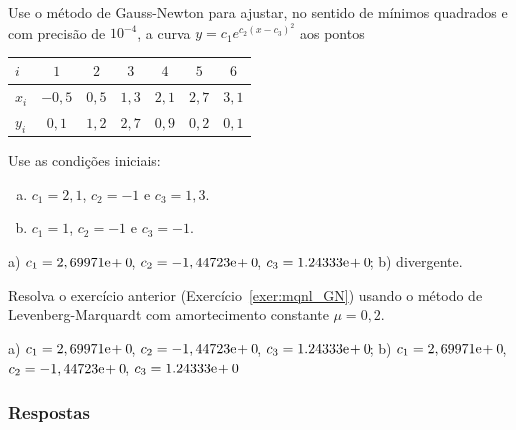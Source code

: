 \begin{exer}\label{exer:mqnl_GN}
  Use o método de Gauss-Newton para ajustar, no sentido de mínimos quadrados e com precisão de $10^{-4}$, a curva $y = c_1e^{c_2(x-c_3)^2}$ aos pontos
  \begin{center}
    \begin{tabular}{l|cccccc}
      $i$ & $1$ & $2$ & $3$ & $4$ & $5$ & $6$ \\\hline
      $x_i$ & $-0,5$ & $0,5$ & $1,3$ & $2,1$ & $2,7$ & $3,1$ \\
      $y_i$ & $0,1$ & $1,2$ & $2,7$ & $0,9$ & $0,2$ & $0,1$ \\\hline
    \end{tabular}
  \end{center}
Use as condições iniciais:
\begin{enumerate}[a)]
\item $c_1 = 2,1$, $c_2=-1$ e $c_3=1,3$.
\item $c_1=1$, $c_2=-1$ e $c_3=-1$.
\end{enumerate}
\end{exer}
\begin{resp}
  a) $c_1 = 2,69971\mathrm{e}\!+0\!$, $c_2 = -1,44723\mathrm{e}\!+0\!$, $c_3 = 1.24333\mathrm{e}\!+0\!$; b) divergente.
\end{resp}

\begin{exer}
  Resolva o exercício anterior (Exercício~\ref{exer:mqnl_GN}) usando o método de Levenberg-Marquardt com amortecimento constante $\mu=0,2$.
\end{exer}
\begin{resp}
  a)  $c_1 = 2,69971\mathrm{e}\!+0\!$, $c_2 = -1,44723\mathrm{e}\!+0\!$, $c_3 = 1.24333\mathrm{e}\!+0\!$; b) $c_1 = 2,69971\mathrm{e}\!+0\!$, $c_2 = -1,44723\mathrm{e}\!+0\!$, $c_3 = 1.24333\mathrm{e}\!+0\!$
\end{resp}

\ifisbook
\subsubsection{Respostas}
\shipoutAnswer
\fi

